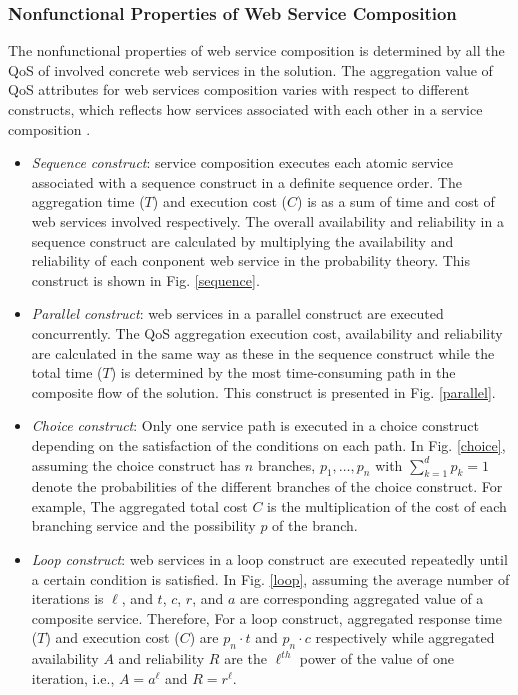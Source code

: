 \subsubsection{Nonfunctional Properties of Web Service Composition}
The nonfunctional properties of web service composition is determined by all the QoS of involved concrete web services in the solution. The aggregation value of QoS attributes for web services composition varies with respect to different constructs, which reflects how services associated with each other in a service composition \cite{zeng2003quality}.
\begin{itemize}

\item \emph{Sequence construct}: service composition executes each atomic service associated with a sequence construct in a definite sequence order. The aggregation time ($T$) and execution cost ($C$) is as a sum of time and cost of web services involved respectively. The overall availability and reliability in a sequence construct are calculated by multiplying the availability and reliability of each conponent web service in the probability theory. This construct is shown in Fig. \ref{sequence}.
\item \emph{Parallel construct}: web services in a parallel construct are executed concurrently. The QoS aggregation execution cost, availability and reliability are calculated in the same way as these in the sequence construct while the total time ($T$) is determined by the most time-consuming path in the composite flow of the solution. This construct is presented in Fig. \ref{parallel}.
\item \emph{Choice construct}: Only one service path is executed in a choice construct depending on the satisfaction of the conditions on each path. In Fig. \ref{choice}, assuming the choice construct has $n$ branches, $p_1,\ldots, p_n$ with  $\sum\limits^d_{k=1}p_k=1$ denote the probabilities of the different branches of the choice construct. For example, The aggregated total cost $C$  is the multiplication of the cost of each branching service and the possibility $p$ of the branch.
\item \emph{Loop construct}: web services in a loop construct are executed repeatedly until a certain condition is satisfied. In Fig. \ref{loop}, assuming the average number of iterations is $\ell$, and $t$, $c$, $r$, and $a$ are corresponding aggregated value of a composite service. Therefore, For a loop construct, aggregated response time ($T$) and execution cost ($C$) are $p_n \cdot t$ and $p_n \cdot c$ respectively while aggregated availability $A$ and reliability $R$ are the $\ell^{th}$ power of the value of one iteration, i.e., $A=a^\ell$ and $R=r^\ell$.
\end{itemize}



